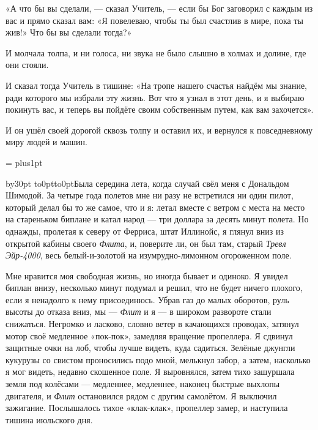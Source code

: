 «А что бы вы сделали, --- сказал Учитель, --- если бы Бог заговорил с каждым из вас и прямо сказал вам: «Я повелеваю, чтобы ты был счастлив в мире, пока ты жив!» Что бы вы сделали тогда?»

И молчала толпа, и ни голоса, ни звука не было слышно в холмах и долине, где они стояли.

И сказал тогда Учитель в тишине: «На тропе нашего счастья найдём мы знание, ради которого мы
избрали эту жизнь. Вот что я узнал в этот день, и я выбираю покинуть вас, и теперь вы пойдёте
своим собственным путем, как вам захочется».

И он ушёл своей дорогой сквозь толпу и оставил их, и вернулся к повседневному миру людей и машин.

\everypar={}
\rightskip=0pt \spaceskip=0pt \xspaceskip=0pt
\normalbaselines
\parskip=0pt plus1pt
\rm
\vfil\eject

{}
\vskip3cm

\begingroup{}
\def\par{\endgraf\endgroup}
\advance\parindent by30pt \hang{}
\noindent\vtop to0pt{\kern-8pt\hbox to0pt{\hss\kern\parindent\bukvfont Б\kern3pt}\vss}ыла середина
лета, когда случай свёл меня с Дональдом Шимодой.
За четыре года полетов мне ни разу не встретился ни один пилот, который делал бы то же самое, что
и я: летал вместе с ветром с места на место на стареньком биплане и катал народ --- три доллара
за десять минут полета. Но однажды, пролетая к северу от Ферриса, штат Иллинойс, я глянул вниз из
открытой кабины своего {\it Флита}, и, поверите ли, он был там, старый {\it Тревл Эйр-4000}, весь
белый-и-золотой на изумрудно-лимонном огороженном поле.

Мне нравится моя свободная жизнь, но иногда бывает и одиноко. Я увидел биплан внизу, несколько
минут подумал и решил, что не будет ничего плохого, если я ненадолго к нему присоединюсь. Убрав
газ до малых оборотов, руль высоты до отказа вниз, мы --- {\it Флит\/} и я --- в широком развороте стали
снижаться. Негромко и ласково, словно ветер в качающихся проводах, затянул мотор своё медленное
«пок-пок», замедляя вращение пропеллера. Я сдвинул защитные очки на лоб, чтобы лучше видеть, куда
садиться. Зелёные джунгли кукурузы со свистом проносились подо мной, мелькнул забор, а затем,
насколько я мог видеть, недавно скошенное поле. Я выровнялся, затем тихо зашуршала земля под
колёсами --- медленнее, медленнее, наконец быстрые выхлопы двигателя, и {\it Флит\/} остановился
рядом с другим самолётом. Я выключил зажигание. Послышалось тихое «клак-клак», пропеллер замер, и наступила тишина июльского дня.

